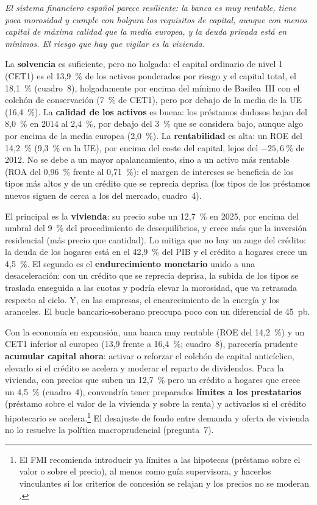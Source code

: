\begin{examen}
\textit{El sistema financiero español parece resiliente: la banca es muy rentable, tiene poca morosidad y cumple con holgura los requisitos de capital, aunque con menos capital de máxima calidad que la media europea, y la deuda privada está en mínimos. El riesgo que hay que vigilar es la vivienda.}

La \textbf{solvencia} es suficiente, pero no holgada: el capital ordinario de nivel 1 (CET1) es el 13,9~\% de los activos ponderados por riesgo y el capital total, el 18,1~\% (cuadro~8), holgadamente por encima del mínimo de Basilea~III con el colchón de conservación (7~\% de CET1), pero por debajo de la media de la UE (16,4~\%). La \textbf{calidad de los activos} es buena: los préstamos dudosos bajan del 8,0~\% en 2014 al 2,4~\%, por debajo del 3~\% que se considera bajo, aunque algo por encima de la media europea (2,0~\%). La \textbf{rentabilidad} es alta: un ROE del 14,2~\% (9,3~\% en la UE), por encima del coste del capital, lejos del $-25{,}6~\%$ de 2012. No se debe a un mayor apalancamiento, sino a un activo más rentable (ROA del 0,96~\% frente al 0,71~\%): el margen de intereses se beneficia de los tipos más altos y de un crédito que se reprecia deprisa (los tipos de los préstamos nuevos siguen de cerca a los del mercado, cuadro~4).

El principal es la \textbf{vivienda}: su precio sube un 12,7~\% en 2025, por encima del umbral del 9~\% del procedimiento de desequilibrios, y crece más que la inversión residencial (más precio que cantidad). Lo mitiga que no hay un auge del crédito: la deuda de los hogares está en el 42,9~\% del PIB y el crédito a hogares crece un 4,5~\%. El segundo es el \textbf{endurecimiento monetario} unido a una desaceleración: con un crédito que se reprecia deprisa, la subida de los tipos se traslada enseguida a las cuotas y podría elevar la morosidad, que va retrasada respecto al ciclo. Y, en las empresas, el encarecimiento de la energía y los aranceles. El bucle bancario-soberano preocupa poco con un diferencial de 45~pb.

Con la economía en expansión, una banca muy rentable (ROE del 14,2~\%) y un CET1 inferior al europeo (13,9 frente a 16,4~\%; cuadro~8), parecería prudente \textbf{acumular capital ahora}: activar o reforzar el colchón de capital anticíclico, elevarlo si el crédito se acelera y moderar el reparto de dividendos. Para la vivienda, con precios que suben un 12,7~\% pero un crédito a hogares que crece un 4,5~\% (cuadro~4), convendría tener preparados \textbf{límites a los prestatarios} (préstamo sobre el valor de la vivienda y sobre la renta) y activarlos si el crédito hipotecario se acelera.\footnote{El FMI recomienda introducir ya límites a las hipotecas (préstamo sobre el valor o sobre el precio), al menos como guía supervisora, y hacerlos vinculantes si los criterios de concesión se relajan y los precios no se moderan .} El desajuste de fondo entre demanda y oferta de vivienda no lo resuelve la política macroprudencial (pregunta~7).
\end{examen}

